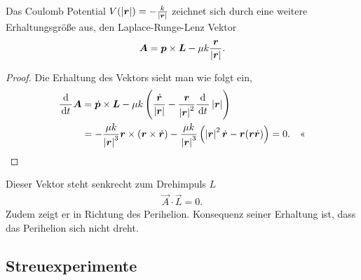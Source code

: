 Das Coulomb Potential $V(\left|\bm{r}\right|) = -\frac{k}{\left|\bm{r}\right|}$ zeichnet
sich durch eine weitere Erhaltungsgröße aus, den Laplace-Runge-Lenz Vektor
\begin{align*}
\bm{A} = \bm{p}\times\bm{L} - \mu k\frac{\bm{r}}{\left|\bm{r}\right|}.
\end{align*}
\begin{proof}
Die Erhaltung des Vektors sieht man wie folgt ein,
\begin{align*}
\frac{\mathrm{d}}{\,\mathrm{d} t\,} \bm{A} &= \dot{\bm{p}}\times\bm{L} - \mu k\left( 
\frac{\dot{\bm{r}}}{\left|\bm{r}\right|} -
\frac{\bm{r}}{\left|\bm{r}\right|^2}\frac{\mathrm{d}}{\,\mathrm{d} t\,}\left|\bm{r}\right| \right)\\
&=
-\frac{\mu k}{\left|\bm{r}\right|^3}\bm{r}\times (\bm{r}\times\dot{\bm{r}}) - \frac{\mu
k}{\left|\bm{r}\right|^3}\left(\left|\bm{r}\right|^2\dot{\bm{r}} -
\bm{r}(\bm{r}\dot{\bm{r}})\right) = 0.\quad\text{<<}
\end{align*}
\end{proof}

Dieser Vektor steht senkrecht zum Drehimpuls $L$
\begin{align*}
\vec{A}\cdot \vec{L} = 0.
\end{align*}
Zudem zeigt er in Richtung des Perihelion. Konsequenz seiner Erhaltung ist,
dass das Perihelion sich nicht dreht.

\subsection{Streuexperimente}

